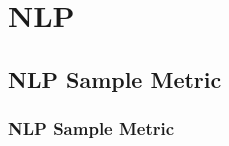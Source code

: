 \chapter{NLP}


\clearpage
\thispagestyle{nlpstyle}
\section{NLP Sample Metric}
\subsection{NLP Sample Metric}